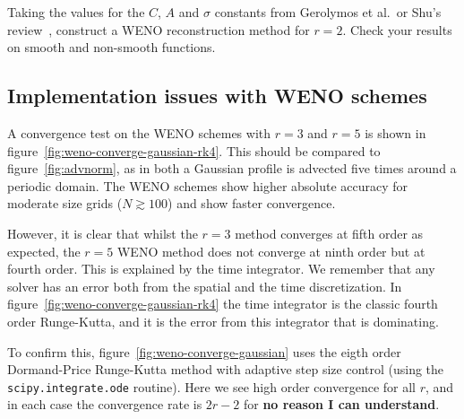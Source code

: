 \begin{exercise}
{Taking the values for the $C$, $A$ and $\sigma$ constants from Gerolymos et
al.\ or Shu's review~\cite{Shu1997}, construct a WENO reconstruction method for
$r=2$. Check your results on smooth and non-smooth functions.}
\end{exercise}

\subsection{Implementation issues with WENO schemes}
\label{sec:weno-implementation}

A convergence test on the WENO schemes with $r=3$ and $r=5$ is shown in
figure~\ref{fig:weno-converge-gaussian-rk4}. This should be compared to
figure~\ref{fig:advnorm}, as in both a Gaussian profile is advected five
times around a periodic domain. The WENO schemes show higher absolute accuracy
for moderate size grids ($N \gtrsim 100$) and show faster convergence.

However, it is clear that whilst the $r=3$ method converges at fifth order as
expected, the $r=5$ WENO method does not converge at ninth order but at fourth
order. This is explained by the time integrator. We remember that any solver
has an error both from the spatial and the time discretization. In
figure~\ref{fig:weno-converge-gaussian-rk4} the time integrator is the classic
fourth order Runge-Kutta, and it is the error from this integrator that is
dominating.

To confirm this, figure~\ref{fig:weno-converge-gaussian} uses the eigth order
Dormand-Price Runge-Kutta method with adaptive step size control (using the
\texttt{scipy.integrate.ode} routine). Here we see high order convergence for
all $r$, and in each case the convergence rate is $2 r - 2$ for \textbf{no
reason I can understand}.

